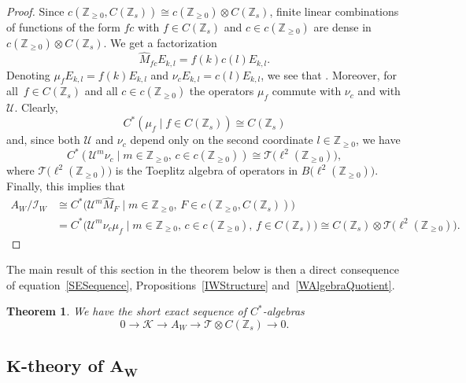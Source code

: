 \documentclass[pdftex]{sigma}
\newcommand{\Z}{{\mathbb Z}}
\numberwithin{equation}{section}
\newtheorem{Theorem}{Theorem}[section]
\begin{document}
\begin{proof}
Since $c(\Z_{\ge0}, C(\Z_s))\cong c(\Z_{\ge0}) \otimes C(\Z_s)$, finite linear combinations of functions of the form $fc$ with $f\in C(\Z_s)$ and $c\in c(\Z_{\ge0})$ are dense in $c(\Z_{\ge0}) \otimes C(\Z_s)$.
We get a factorization
\begin{equation*}
 \widehat M_{fc} E_{k,l} = f(k)c(l) E_{k,l}.
\end{equation*}
Denoting
$\mu_{f} E_{k,l} = f(k) E_{k,l}$ and $ \nu_{c} E_{k,l} = c(l) E_{k,l}$,
we see that . Moreover, for all~${f\in C(\Z_s)}$ and all $c\in c(\Z_{\ge0})$ the operators $\mu_f$ commute with $\nu_{c}$ and with $\mathcal{U}$. Clearly,
\begin{equation*}
C^*(\mu_f\mid f\in C(\Z_s))\cong C(\Z_s)
\end{equation*}
and, since both $\mathcal{U}$ and $\nu_{c}$ depend only on the second coordinate $l\in\Z_{\ge0}$, we have
\begin{equation*}
C^*(\mathcal{U}^m\nu_{c}\mid m\in \Z_{\ge0},\, c\in c(\Z_{\ge0}))\cong \mathcal{T}\bigl(\ell^2(\Z_{\ge0})\bigr),
\end{equation*}
where $\mathcal{T}\bigl(\ell^2(\Z_{\ge0})\bigr)$ is the Toeplitz algebra of operators in $B\bigl(\ell^2(\Z_{\ge0})\bigr)$. Finally, this implies that
\begin{align*}
A_W/\mathcal{I}_W&\cong
C^*\big(\mathcal{U}^m \widehat M_F\mid m\in \Z_{\ge0},\, F\in c(\Z_{\ge0}, C(\Z_s))\big)\\
&=C^*\big(\mathcal{U}^m\nu_{c}\mu_f\mid m\in \Z_{\ge0},\, c\in c(\Z_{\ge0}),\, f\in C(\Z_s)\big)\cong C(\Z_s)\otimes \mathcal{T}\bigl(\ell^2(\Z_{\ge0})\bigr).\tag*{\qed}
\end{align*}\renewcommand{\qed}{}
\end{proof}

The main result of this section in the theorem below is then a direct consequence of equation~\eqref{SESequence}, Propositions~\ref{IWStructure} and~\ref{WAlgebraQuotient}.
\begin{Theorem}
We have the short exact sequence of $C^*$-algebras
\begin{equation*}%
0\rightarrow \mathcal{K}\rightarrow A_W\rightarrow \mathcal{T}\otimes C(\Z_s)\rightarrow 0 .
\end{equation*}
\end{Theorem}


\subsection[K-theory of A\_W]{$\boldsymbol{K}$-theory of $\boldsymbol{A_W}$}
\end{document}
